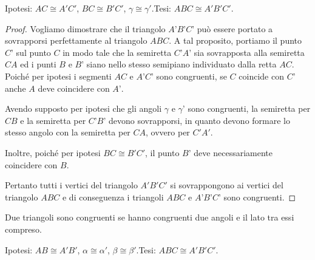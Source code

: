 \noindent Ipotesi: $AC\cong A'C'$, $BC\cong B'C'$, $\gamma \cong \gamma'$.\tab Tesi:  $ABC \cong A'B'C'$.

\begin{proof}
Vogliamo dimostrare che il triangolo $A’B’C’$ può essere portato a sovrapporsi perfettamente al triangolo $ABC$.
A tal proposito, portiamo il punto $C’$ sul punto $C$ in modo tale che la semiretta $C’A’$ sia sovrapposta alla semiretta $CA$ ed i punti $B$ e $B’$ siano nello stesso semipiano individuato dalla retta $AC$.
Poiché per ipotesi i segmenti $AC$ e $A’C’$ sono congruenti, se $C$ coincide con $C’$ anche $A$ deve coincidere con $A’$.

Avendo supposto per ipotesi che gli angoli $\gamma$ e $\gamma’$ sono congruenti, la semiretta per $CB$ e la semiretta per $C’B’$ devono sovrapporsi, in quanto devono formare lo stesso angolo con la semiretta per $CA$, ovvero per $C'A'$.

Inoltre, poiché per ipotesi $BC\cong B'C'$, il punto $B’$ deve necessariamente coincidere con $B$.

Pertanto tutti i vertici del triangolo $A'B'C'$ si sovrappongono ai vertici del triangolo $ABC$ e di conseguenza i triangoli $ABC$ e $A’B’C’$ sono congruenti.
\end{proof}

\begin{teorema}
Due triangoli sono congruenti se hanno congruenti due angoli e il lato tra essi compreso.
\end{teorema}

\begin{figure}[htb]
\centering
\end{figure}

\noindent Ipotesi: $AB\cong A'B'$, $\alpha\cong \alpha'$, $\beta \cong \beta'$.\tab Tesi:  $ABC \cong A'B'C'$.


